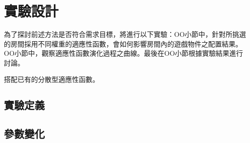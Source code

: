 \renewcommand\thetable{\arabic{chapter}-\arabic{table}}
\chapter{實驗設計}
\label{cha:experimentdesign}

為了探討前述方法是否符合需求目標，將進行以下實驗：OO小節中，針對所挑選的房間採用不同權重的適應性函數，會如何影響房間內的遊戲物件之配置結果。OO小節中，觀察適應性函數演化過程之曲線。最後在OO小節根據實驗結果進行討論。


搭配已有的分散型適應性函數。

\section{實驗定義}
\label{sec:experimentdesign-}



\section{參數變化}
\label{sec:experimentdesign-}


